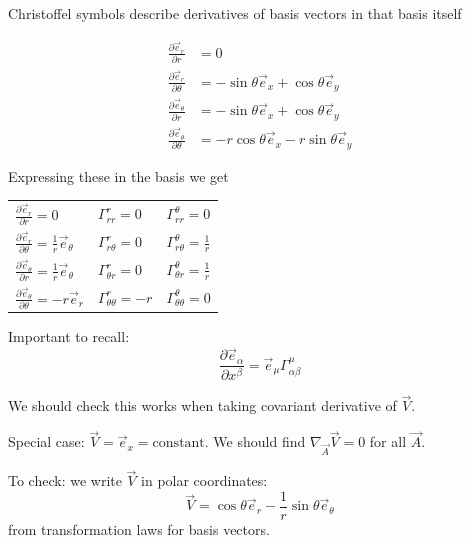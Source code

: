 \documentclass[a4paper]{article} %
\begin{document}
Christoffel symbols describe derivatives of basis vectors in that basis itself

\begin{align}
\frac{\partial \vec{e}_r}{\partial r}&=0\\
\frac{\partial \vec{e}_r}{\partial \theta}&=-\sin\theta\vec{e}_x+\cos\theta \vec{e}_y\\
\frac{\partial \vec{e}_{\theta}}{\partial r}&=-\sin\theta\vec{e}_x+\cos\theta\vec{e}_y\\
\frac{\partial \vec{e}_{\theta}}{\partial \theta}&=-r\cos\theta \vec{e}_x-r\sin\theta\vec{e}_y
\end{align}

Expressing these in the basis we get
\begin{center}
\begin{tabular}{l|l|l}
$\frac{\partial \vec{e}_r}{\partial r}=0$ & $\Gamma^{r}_{rr}=0$&$\Gamma^{\theta}_{rr}=0$\\
$\frac{\partial \vec{e}_r}{\partial \theta}=\frac{1}{r}\vec{e}_\theta$ & $\Gamma^{r}_{r\theta}=0$&$\Gamma^{\theta}_{r\theta}=\frac{1}{r}$\\
$\frac{\partial \vec{e}_{\theta}}{\partial r}=\frac{1}{r}\vec{e}_{\theta}$ & $\Gamma^{r}_{\theta r}=0$&$\Gamma^{\theta}_{\theta r}=\frac{1}{r}$\\
$\frac{\partial \vec{e}_{\theta}}{\partial \theta}=-r\vec{e}_r$ & $\Gamma^{r}_{\theta\theta}=-r$&$\Gamma^{\theta}_{\theta \theta}=0$\\
\end{tabular}
\end{center}

Important to recall:
\begin{equation}
\frac{\partial \vec{e}_{\alpha}}{\partial x^{\beta}}=\vec{e}_{\mu}\Gamma^{\mu}_{\alpha\beta}
\end{equation}

We should check this works when taking covariant derivative of $\vec{V}$.

Special case: $\vec{V}=\vec{e}_{x}=\text{constant}$. We should find $\nabla_{\vec{A}}\vec{V}=0$ for all $\vec{A}$.

To check: we write $\vec{V}$ in polar coordinates:
\begin{equation}
\vec{V}=\cos\theta\vec{e}_{r}-\frac{1}{r}\sin\theta\vec{e}_{\theta}
\end{equation}
from transformation laws for basis vectors.
\end{document}
